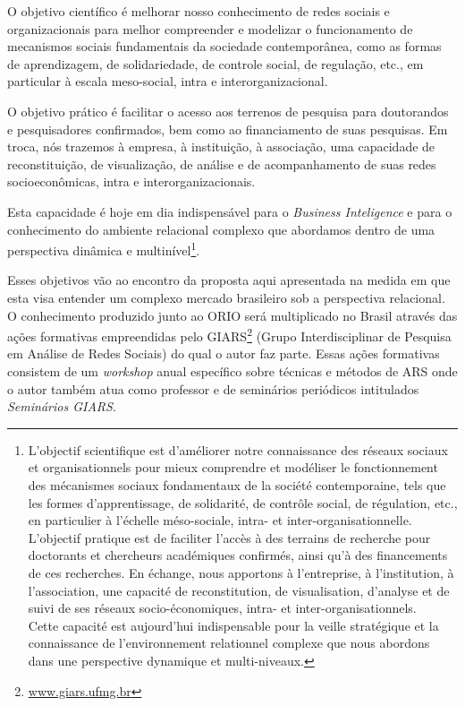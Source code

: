 \documentclass[a4paper, 12pt, openright, oneside, german, french, english, brazil, article]{abntex2}
\begin{document}
\begin{citacao}
O objetivo científico é melhorar nosso conhecimento de redes sociais e organizacionais para melhor compreender e modelizar o funcionamento de mecanismos sociais fundamentais da sociedade contemporânea, como as formas de aprendizagem, de solidariedade, de controle social, de regulação, etc., em particular à escala meso-social, intra e interorganizacional.

O objetivo prático é facilitar o acesso aos terrenos de pesquisa para doutorandos e pesquisadores confirmados, bem como ao financiamento de suas pesquisas. Em troca, nós trazemos à empresa, à instituição, à associação, uma capacidade de reconstituição, de visualização, de análise e de acompanhamento de suas redes socioeconômicas, intra e interorganizacionais.

Esta capacidade é hoje em dia indispensável para o \textit{Business Inteligence} e para o conhecimento do ambiente relacional complexo que abordamos dentro de uma perspectiva dinâmica e multinível\footnote{L’objectif scientifique est d’améliorer notre connaissance des réseaux sociaux et organisationnels pour mieux comprendre et modéliser le fonctionnement des mécanismes sociaux fondamentaux de la société contemporaine, tels que les formes d’apprentissage, de solidarité, de contrôle social, de régulation, etc., en particulier à l’échelle méso-sociale, intra- et inter-organisationnelle.\\
L’objectif pratique est de faciliter l’accès à des terrains de recherche pour doctorants et chercheurs académiques confirmés, ainsi qu’à des financements de ces recherches. En échange, nous apportons à l’entreprise, à l’institution, à l’association, une capacité de reconstitution, de visualisation, d’analyse et de suivi de ses réseaux socio-économiques, intra- et inter-organisationnels.\\
Cette capacité est aujourd’hui indispensable pour la veille stratégique et la connaissance de l’environnement relationnel complexe que nous abordons dans une perspective dynamique et multi-niveaux.}.
\end{citacao}

Esses objetivos vão ao encontro da proposta aqui apresentada na medida em que esta visa entender um complexo mercado brasileiro sob a perspectiva relacional. O conhecimento produzido junto ao ORIO será multiplicado no Brasil através das ações formativas empreendidas pelo GIARS\footnote{\url{www.giars.ufmg.br}} (Grupo Interdisciplinar de Pesquisa em Análise de Redes Sociais) do qual o autor faz parte. Essas ações formativas consistem de um \textit{workshop} anual específico sobre técnicas e métodos de ARS onde o autor também atua como professor e de seminários periódicos intitulados \textit{Seminários GIARS}.
\end{document}
